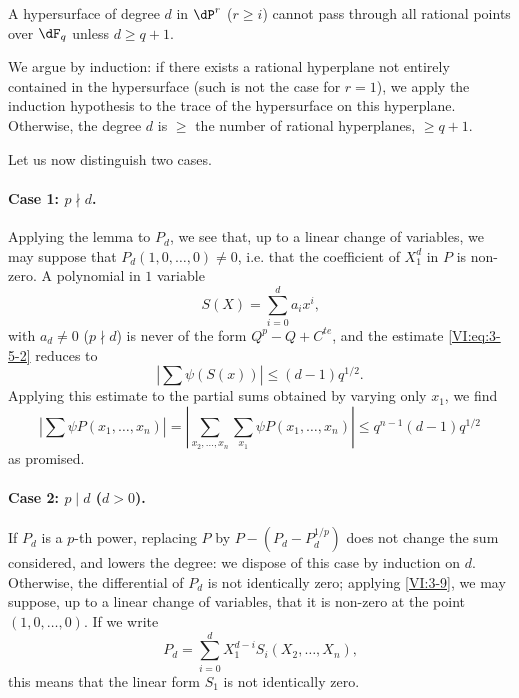 \begin{lemma_}\label{VI:3-9}
A hypersurface of degree $d$ in $\dP^r$ ($r\geqslant i$) cannot pass
through all rational points over $\dF_q$ unless $d\geqslant q+1$.
\end{lemma_}

We argue by induction: if there exists a rational hyperplane not
entirely contained in the hypersurface (such is not the case for $r=1$), we
apply the induction hypothesis to the trace of the hypersurface on this
hyperplane. Otherwise, the degree $d$ is $\geqslant$ the number of rational
hyperplanes, $\geqslant q+1$.

Let us now distinguish two cases.


\paragraph{Case 1: $p\nmid d$.}
Applying the lemma to $P_d$, we see that, up to a linear
change of variables, we may suppose that $P_d(1,0,\ldots,0)\ne 0$, i.e.
that the coefficient of $X_1^d$ in $P$ is non-zero. A polynomial in $1$
variable 
\[
  S(X) = \sum_{i=0}^d a_i x^i \text{,} 
\]
with $a_d\ne 0$ ($p\nmid d$) is never of the form $Q^p-Q+C^{t e}$, and
the estimate \eqref{VI:eq:3-5-2} reduces to
\[
  \left| \sum \psi(S(x)) \right| \leqslant (d-1) q^{1/2} \text{.}
\]
Applying this estimate to the partial sums obtained by varying only
$x_1$, we find 
\[
  \left| \sum \psi P(x_1,\dots,x_n) \right| = \left| \sum_{x_2,\dots,x_n} \sum_{x_1} \psi P(x_1,\dots,x_n)\right| \leqslant q^{n-1} (d-1) q^{1/2} 
\]
as promised.


\paragraph{Case 2: $p\mid d$ ($d>0$).}
If $P_d$ is a $p$-th power, replacing $P$ by $P-(P_d-P_d^{1/p})$ does not
change the sum considered, and lowers the degree: we dispose of
this case by induction on $d$. Otherwise, the differential of
$P_d$ is not identically zero; applying \ref{VI:3-9}, we may suppose,
up to a linear change of variables, that it is non-zero
at the point $(1,0,\dots,0)$. If we write 
\[
  P_d = \sum_{i=0}^d X_1^{d-i} S_i(X_2,\dots,X_n) \text{,} 
\]
this means that the linear form $S_1$ is not identically zero.

